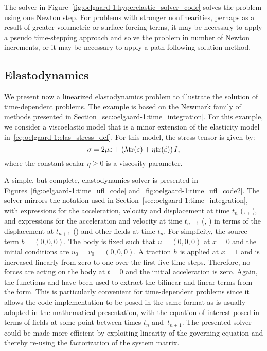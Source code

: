 The solver in Figure~\ref{fig:oelgaard-1:hyperelastic_solver_code}
solves the problem using one Newton step. For problems with stronger
nonlinearities, perhaps as a result of greater volumetric or surface
forcing terms, it may be necessary to apply a pseudo time-stepping
approach and solve the problem in number of Newton increments, or it
may be necessary to apply a path following solution method.

\subsection{Elastodynamics}

We present now a linearized elastodynamics problem to
illustrate the solution of time-dependent problems. The
example is based on the Newmark family of methods presented in
Section~\ref{sec:oelgaard-1:time_integration}.  For this example, we
consider a viscoelastic model that is a minor extension of the elasticity
model in~\eqref{eq:oelgaard-1:elas_stress_def}.  For this model, the
stress tensor is given by:
\begin{equation}
  \sigma = 2\mu \varepsilon
   + \left( \lambda {\rm tr}(\varepsilon) + \eta {\rm tr}(\Dot{\varepsilon}) \right) I,
\label{eq:oelgaard-1:viscoelastic}
\end{equation}
where the constant scalar $\eta \ge 0$ is a viscosity parameter.

A simple, but complete, elastodynamics solver is
presented in Figures~\ref{fig:oelgaard-1:time_ufl_code}
and~\ref{fig:oelgaard-1:time_ufl_code2}.  The solver mirrors the notation
used in Section~\ref{sec:oelgaard-1:time_integration}, with expressions
for the acceleration, velocity and displacement at time $t_{n}$
(, , ), and expressions for the acceleration
and velocity at time $t_{n+1}$ (, ) in terms of the
displacement at $t_{n+1}$ () and other fields at time $t_{n}$.
For simplicity, the source term $b = (0, 0, 0)$.  The body is fixed such
that $u = (0, 0, 0)$ at $x=0$ and the initial conditions are
$u_{0} = v_{0} = (0, 0, 0)$.
A traction $h$ is applied at $x=1$ and is increased linearly from zero
to one over the first five time steps.  Therefore, no forces are acting
on the body at $t=0$ and the initial acceleration is zero.  Again, the
\ufl{} functions  and  have been used to extract the
bilinear and linear terms from the form.  This is particularly convenient
for time-dependent problems since it allows the code implementation to
be posed in the same format as is usually adopted in the mathematical
presentation, with the equation of interest posed in terms of fields at
some point between times $t_{n}$ and~$t_{n+1}$.  The presented solver
could be made more efficient by exploiting linearity of the governing
equation and thereby re-using the factorization of the system matrix.

